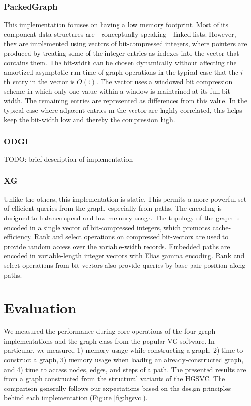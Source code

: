 \documentclass{article}
\begin{document}
\subsubsection{PackedGraph}

This implementation focuses on having a low memory footprint.
Most of its component data structures are---conceptually speaking---linked lists.
However, they are implemented using vectors of bit-compressed integers, where pointers are produced by treating some of the integer entries as indexes into the vector that contains them.
The bit-width can be chosen dynamically without affecting the amortized asymptotic run time of graph operations in the typical case that the $i$-th entry in the vector is $O(i)$.
The vector uses a windowed bit compression scheme in which only one value within a window is maintained at its full bit-width.
The remaining entries are represented as differences from this value.
In the typical case where adjacent entries in the vector are highly correlated, this helps keep the bit-width low and thereby the compression high. 

\subsubsection{ODGI}

TODO: brief description of implementation

\subsubsection{XG}

Unlike the others, this implementation is static.
This permits a more powerful set of efficient queries from the graph, especially from paths.
The encoding is designed to balance speed and low-memory usage.
The topology of the graph is encoded in a single vector of bit-compressed integers, which promotes cache-efficiency.
Rank and select operations on compressed bit-vectors are used to provide random access over the variable-width records.
Embedded paths are encoded in variable-length integer vectors with Elias gamma encoding.
Rank and select operations from bit vectors also provide queries by base-pair position along paths.

\section{Evaluation}

We measured the performance during core operations of the four graph implementations and the graph class from the popular VG software.
In particular, we measured 1) memory usage while constructing a graph, 2) time to construct a graph, 3) memory usage when loading an already-constructed graph, and 4) time to access nodes, edges, and steps of a path.
The presented results are from a graph constructed from the structural variants of the HGSVC.
The comparison generally follows our expectations based on the design principles behind each implementation (Figure \ref{fig:hgsvc}).
\end{document}
